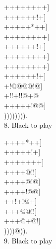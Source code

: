 \documentclass[mcrownvopaper,10pt,twopage,onecolumn,final]{memoir}
\begin{document}
\begin{figure}[ht]
    \begin{minipage}[c]{0.5\linewidth}
        \centering    
        {\gnos%
        ++++++++]\\
        ++++++!+]\\
        +++++*++]\\
        ++++++++]\\
        ++++++!+]\\
        ++++++++]\\
        ++++++++]\\
        ++++++!+]\\
        +!@@@@!@]\\
        +!!+!!@+@\\
        +++++!@@]\\
        )))))))).\\
        }
        8. Black to play
    \end{minipage}%
    \begin{minipage}[c]{0.5\linewidth}
        \centering    
        {\gnos%
        ++++*++]\\
        +++++!+]\\
        +++++++]\\
        ++++@!!]\\
        ++++@!@]\\
        ++++!@@]\\
        ++!+!@+]\\
        +++@@!!]\\
        +++@+@!]\\
        ))))@)).\\
        }
        9. Black to play
    \end{minipage}
\end{figure}
\end{document}
